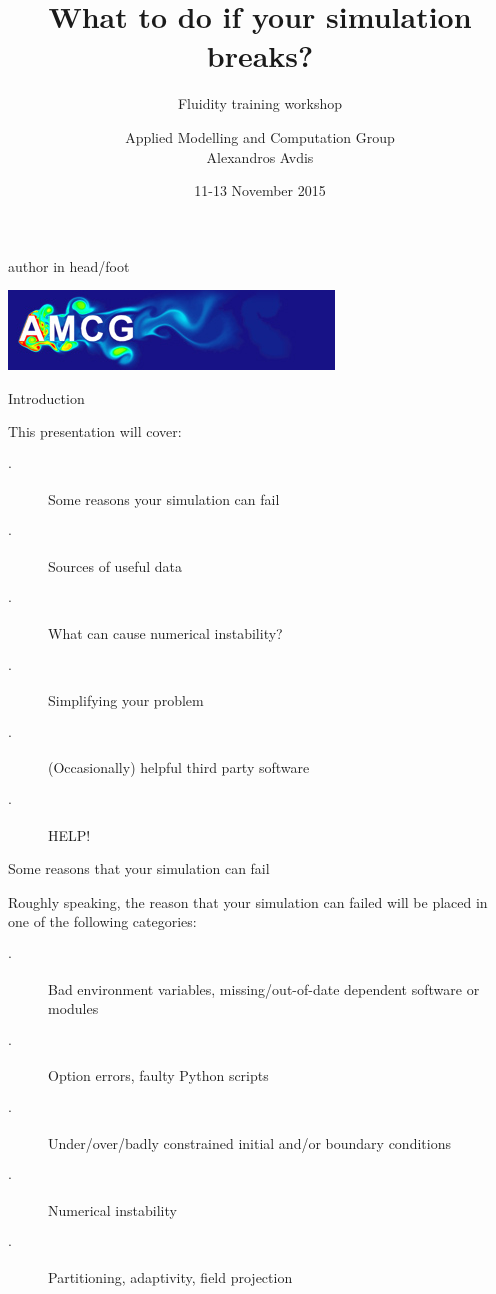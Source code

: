 \documentclass[t]{beamer}
\author[Alexandros Avdis]{Applied Modelling and Computation Group\\[15pt]Alexandros Avdis}
\institute{Department of Earth Science and Engineering, Imperial College London}
\date{11-13 November 2015}
\title[What to do if your simulation breaks?]{What to do if your simulation breaks?}
\subtitle[]{Fluidity training workshop}
\begin{document}
{%
\begin{beamercolorbox}[ht=.35cm,dp=0.2cm,wd=\textwidth,leftskip=.3cm]{author in head/foot}%
        \begin{minipage}[c]{5cm}%
        \end{minipage}\hfill%
        \begin{minipage}{6cm}
        \hfill\includegraphics[height=.5cm]{AMCGFlow-long}
        \end{minipage}
\end{beamercolorbox}%
}
\begin{frame}
\titlepage
\end{frame}

\begin{frame}{Introduction}

This presentation will cover:
\vspace{1ex}
\begin{description}
 \item[$\cdot$] Some reasons your simulation can fail
 \item[$\cdot$] Sources of useful data
 \item[$\cdot$] What can cause numerical instability?
 \item[$\cdot$] Simplifying your problem
 \item[$\cdot$] (Occasionally) helpful third party software 
 \item[$\cdot$] HELP!
\end{description}
\end{frame}


\begin{frame}{Some reasons that your simulation can fail}

Roughly speaking, the reason that your simulation can failed will be placed in one of the following categories:
\vspace{1ex}

\begin{description}
 \item[$\cdot$] Bad environment variables, missing/out-of-date dependent software or modules
 \item[$\cdot$] Option errors, faulty Python scripts
 \item[$\cdot$] Under/over/badly constrained initial and/or boundary conditions
 \item[$\cdot$] Numerical instability
 \item[$\cdot$] Partitioning, adaptivity, field projection
\end{description}

\end{frame}
\end{document}
